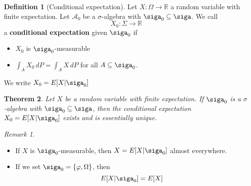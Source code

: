 \documentclass[10pt, oneside, reqno]{amsart}
\theoremstyle{plain}%
\newtheorem{thm}{Theorem}[section]
\theoremstyle{definition}
\newtheorem{defn}[thm]{Definition}
\theoremstyle{remark}
\newtheorem*{rem}{Remark}
\newcommand{\R}{\mathbb{R}}
\renewcommand{\phi}{\varphi}
\begin{document}
\begin{defn}[Conditional expectation]
    Let $X: \Omega \rightarrow \R$ a random variable with finite expectation.  Let $\mathcal{A}_0$ be a $\sigma$-algebra with $\siga_0 \subseteq \siga$. We call \[
        X_0 : \Sigma \rightarrow \R
    \] a \textbf{conditional expectation} given $\siga_0$ if 
    \begin{itemize}
        \item $X_0$ is $\siga_0$-measurable
        \item $\int_A X_0 \, dP = \int_A X \, dP$ for all $A \subseteq \siga_0$.
    \end{itemize}
    We write $X_0 = E[X | \siga_0]$
\end{defn}

\begin{thm}
    Let $X$ be a random variable with finite expectation.  If $\siga_0$ is a $\sigma$-algebra with $\siga_0 \subseteq \siga$, then the conditional expectation $X_0 = E[X | \siga_0]$ exists and is essentially unique.
\end{thm}

\begin{rem}
    \begin{itemize}
        \item If $X$ is $\siga_0$-measurable, then $X = E[X | \siga_0]$ almost everywhere.
        \item If we set $\siga_0 = \{ \phi, \Omega \}$, then \[
            E[X | \siga_0] = E[X]
        \] 
    \end{itemize}
\end{rem}



\end{document}
